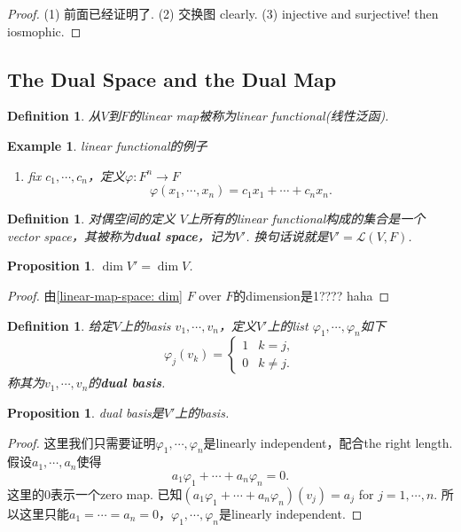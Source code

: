 \documentclass{article}
\newtheorem{proposition}[theorem]{Proposition}
\newtheorem{example}[theorem]{Example}
\newtheorem{definition}[theorem]{Definition}
\newcommand*{\xfunc}[4]{{#2}\colon{#3}{#1}{#4}}
\newcommand*{\func}[3]{\xfunc{\to}{#1}{#2}{#3}}
\begin{document}
\begin{proof}
(1) 前面已经证明了.
(2) 交换图 clearly.
(3) injective and surjective! then iosmophic.
\end{proof}

\newpage
\subsection{The Dual Space and the Dual Map}

\begin{definition}
\rm 从$V$到$F$的linear map被称为linear functional(线性泛函).
\end{definition}

\begin{example}
linear functional的例子
\begin{enumerate}
	\item fix $c_1,\cdots,c_n$，定义$\func{\varphi}{F^n}{F}$
	$$
		\varphi(x_1,\cdots,x_n) = c_1x_1+\cdots+c_nx_n.
	$$ 
\end{enumerate}
\end{example}

\begin{definition}
\rm {\color{red} 对偶空间的定义} $V$上所有的linear functional构成的集合是一个vector space，其被称为\textbf{dual space}，记为$V'$. 换句话说就是$V' = \mathcal{L}(V,F)$.
\end{definition}

\begin{proposition}	
$\dim V' = \dim V$.
\end{proposition}

\begin{proof}
由\ref{linear-map-space: dim} $F$ over $F$的dimension是1???? haha
\end{proof}

\begin{definition}
\rm 给定$V$上的basis $v_1,\cdots,v_n$，定义$V'$上的list $\varphi_1,\cdots,\varphi_n$如下
$$
\varphi_j(v_k)= \left\{ \begin{array}{cc}
1 & k=j, \\
0 & k\neq j.
\end{array} \right.
$$
称其为$v_1,\cdots,v_n$的\textbf{dual basis}.
\end{definition}

\begin{proposition}
\rm dual basis是$V'$上的basis.
\end{proposition}

\begin{proof}
这里我们只需要证明$\varphi_1,\cdots,\varphi_n$是linearly independent，配合the right length. 假设$a_1,\cdots,a_n$使得
$$
a_1\varphi_1 + \cdots + a_n\varphi_n=0.
$$
这里的$0$表示一个zero map. 已知$(a_1\varphi_1 + \cdots + a_n\varphi_n)(v_j) = a_j$ for $j = 1,\cdots,n$. 所以这里只能$a_1 = \cdots = a_n =0$，$\varphi_1,\cdots,\varphi_n$是linearly independent. 
\end{proof}
\end{document}
